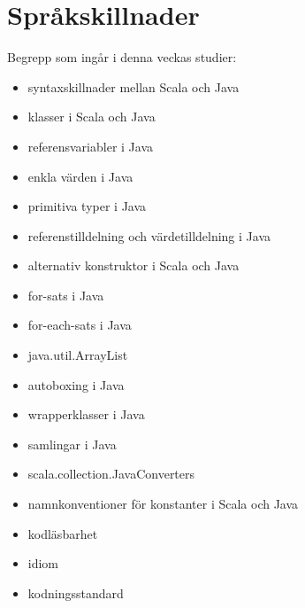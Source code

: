 \chapter{Språkskillnader}\label{chapter:W11}
Begrepp som ingår i denna veckas studier:
\begin{itemize}[noitemsep,label={$\square$},leftmargin=*]
\item syntaxskillnader mellan Scala och Java
\item klasser i Scala och Java
\item referensvariabler i Java
\item enkla värden i Java
\item primitiva typer i Java
\item referenstilldelning och värdetilldelning i Java
\item alternativ konstruktor i Scala och Java
\item for-sats i Java
\item for-each-sats i Java
\item java.util.ArrayList
\item autoboxing i Java
\item wrapperklasser i Java
\item samlingar i Java
\item scala.collection.JavaConverters
\item namnkonventioner för konstanter i Scala och Java
\item kodläsbarhet
\item idiom
\item kodningsstandard\end{itemize}
